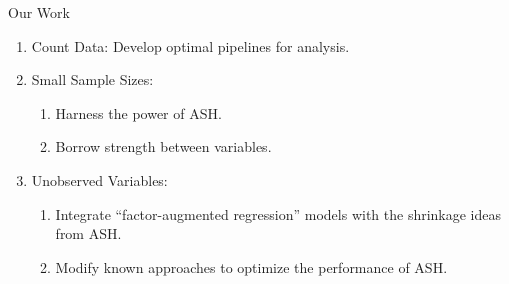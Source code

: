 \documentclass[evncountsect]{beamer}
\begin{document}
\begin{frame}{Our Work}
  \begin{enumerate}
  \item Count Data: Develop optimal pipelines for analysis.\medskip
  \item Small Sample Sizes:
    \begin{enumerate}
    \item Harness the power of ASH.\smallskip
    \item Borrow strength between variables.
    \end{enumerate}\medskip
  \item Unobserved Variables:
    \begin{enumerate}
    \item Integrate ``factor-augmented regression'' models with the
      shrinkage ideas from ASH. \smallskip
    \item Modify known approaches to optimize the performance of ASH.
    \end{enumerate}
  \end{enumerate}
\end{frame}
\end{document}
